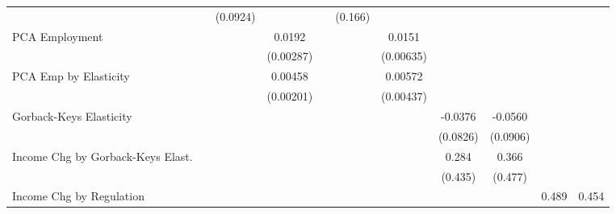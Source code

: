 {\begin{tabular}{l*{10}{c}}
                    &                     &    (0.0924)         &                     &                     &     (0.166)         &                     &                     &                     &                     &                     \\
[1em]
PCA Employment      &                     &                     &      0.0192\sym{***}&                     &                     &      0.0151\sym{**} &                     &                     &                     &                     \\
                    &                     &                     &   (0.00287)         &                     &                     &   (0.00635)         &                     &                     &                     &                     \\
[1em]
PCA Emp by Elasticity&                     &                     &     0.00458\sym{**} &                     &                     &     0.00572         &                     &                     &                     &                     \\
                    &                     &                     &   (0.00201)         &                     &                     &   (0.00437)         &                     &                     &                     &                     \\
[1em]
Gorback-Keys Elasticity&                     &                     &                     &                     &                     &                     &     -0.0376         &     -0.0560         &                     &                     \\
                    &                     &                     &                     &                     &                     &                     &    (0.0826)         &    (0.0906)         &                     &                     \\
[1em]
Income Chg by Gorback-Keys Elast.&                     &                     &                     &                     &                     &                     &       0.284         &       0.366         &                     &                     \\
                    &                     &                     &                     &                     &                     &                     &     (0.435)         &     (0.477)         &                     &                     \\
[1em]
Income Chg by Regulation&                     &                     &                     &                     &                     &                     &                     &                     &       0.489\sym{**} &       0.454\sym{*}  \\

\end{tabular}}
